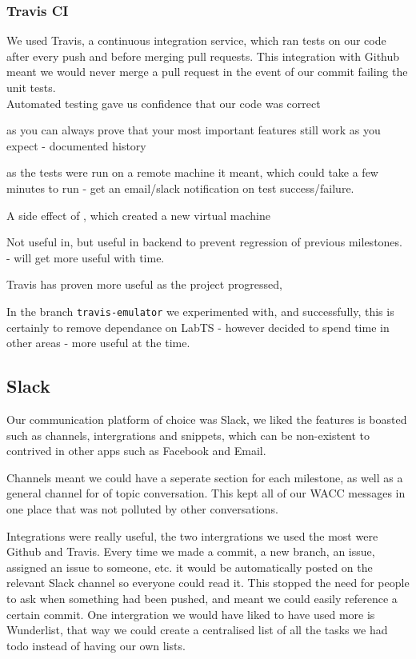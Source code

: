 \documentclass[11pt,a4paper]{article}
\begin{document}
\subsubsection{Travis CI}
\label{subs:Travis}
We used Travis, a continuous integration service, which ran tests on our code after every push and before merging pull requests. This integration with Github meant we would never merge a pull request in the event of our commit failing the unit tests.\\
Automated testing gave us confidence that our code was correct

as you can always prove that your most important features still work as you expect - documented history

as the tests were run on a remote machine it meant, which could take a few minutes to run - get an email/slack notification on test success/failure.

A side effect of , which created a new virtual machine  

Not useful in, but useful in backend to prevent regression of previous milestones. - will get more useful with time.

Travis has proven more useful as the project progressed, 

In the branch \texttt{travis-emulator} we experimented with, and successfully, this is certainly to remove dependance on LabTS - however decided to spend time in other areas - more useful at the time.

\subsection{Slack}
\label{sub:Slack}
Our communication platform of choice was Slack, we liked the features is boasted such as channels, intergrations and snippets, which can be non-existent to contrived in other apps such as Facebook and Email.

Channels meant we could have a seperate section for each milestone, as well as a general channel for of topic conversation. This kept all of our WACC messages in one place that was not polluted by other conversations.

Integrations were really useful, the two intergrations we used the most were Github and Travis. Every time we made a commit, a new branch, an issue, assigned an issue to someone, etc. it would be automatically posted on the relevant Slack channel so everyone could read it. This stopped the need for people to ask when something had been pushed, and meant we could easily reference a certain commit. One intergration we would have liked to have used more is Wunderlist, that way we could create a centralised list of all the tasks we had todo instead of having our own lists.
\end{document}
